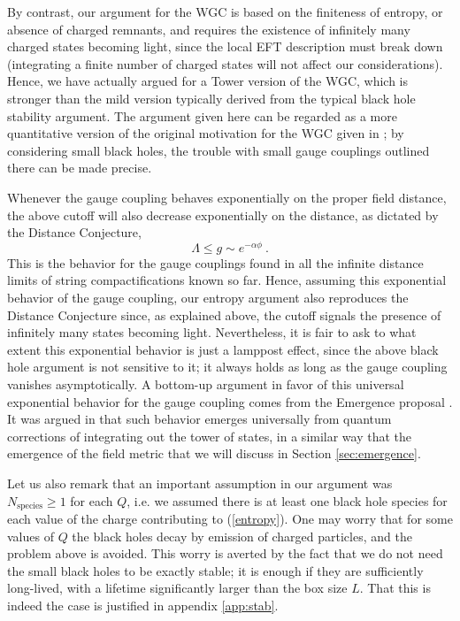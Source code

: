 \documentclass[11pt]{article}
\numberwithin{equation}{section}
\newcommand{\eq}[1]{(\ref{#1})}
\newcommand{\beq}{\begin{equation}}  \newcommand{\eeq}{\end{equation}}
\numberwithin{equation}{section}
\theoremstyle{remark}
\begin{document}
By contrast, our argument for the WGC is based on the finiteness of entropy, or absence of charged remnants, and requires the existence of infinitely many charged states becoming light, since the local EFT description must break down (integrating a finite number of charged states will not affect our considerations). Hence, we have actually argued for a Tower version of the WGC, which is stronger than the mild version typically derived from the typical black hole stability argument. The argument given here can be regarded as a more quantitative version of the original motivation for the WGC given in \cite{Arkani-Hamed:2006emk}; by considering small black holes, the trouble with small gauge couplings outlined there can be made precise.

Whenever the gauge coupling behaves exponentially on the proper field distance, the above cutoff will also decrease exponentially on the distance, as dictated by the Distance Conjecture,
\beq
\Lambda\leq g \sim e^{-\alpha \phi}\ .
\eeq
This is the behavior for the gauge couplings found in all the infinite distance limits of string compactifications known so far. Hence, assuming this exponential behavior of the gauge coupling, our entropy argument also reproduces the Distance Conjecture since, as explained above, the cutoff signals the presence of infinitely many states becoming light. Nevertheless, it is fair to ask to what extent this exponential behavior is just a lamppost effect, since the above black hole argument is not sensitive to it; it always holds as long as the gauge coupling vanishes asymptotically. A bottom-up argument in favor of this universal exponential behavior for the gauge coupling comes from the Emergence proposal \cite{Harlow:2015lma,Heidenreich:2017sim,Grimm:2018ohb,Heidenreich:2018kpg,Corvilain:2018lgw,Palti:2019pca}. It was argued in \cite{Heidenreich:2017sim,Grimm:2018ohb} that such behavior emerges universally from quantum corrections of integrating out the tower of states, in a similar way that the emergence of the field metric that we will discuss in Section \ref{sec:emergence}. 


Let us also remark that an important assumption in our argument was $N_{\text{species}}\geq1$ for each $Q$, i.e. we assumed there is at least one black hole species for each value of the charge contributing to \eq{entropy}.
One may worry that for some values of $Q$ the black holes decay by emission of charged particles, and the problem above is avoided. This worry is averted by the fact that we do not need the small black holes to be exactly stable; it is enough if they are sufficiently long-lived, with a lifetime significantly larger than the box size $L$. That this is indeed the case is justified in appendix \ref{app:stab}.%
\end{document}
